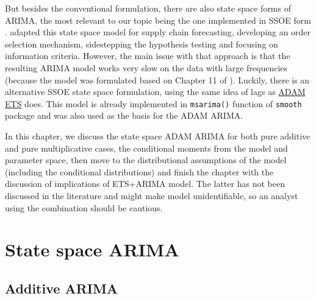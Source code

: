 \documentclass[
]{book}
\theoremstyle{definition}
\theoremstyle{definition}
\theoremstyle{definition}
\theoremstyle{definition}
\theoremstyle{remark}
\begin{document}
But besides the conventional formulation, there are also state space forms of ARIMA, the most relevant to our topic being the one implemented in SSOE form \citep[Chapter 11 of][]{Hyndman2008b}. \citet{Svetunkov2019} adapted this state space model for supply chain forecasting, developing an order selection mechanism, sidestepping the hypothesis testing and focusing on information criteria. However, the main issue with that approach is that the resulting ARIMA model works very slow on the data with large frequencies (because the model was formulated based on Chapter 11 of \citet{Hyndman2008b}). Luckily, there is an alternative SSOE state space formulation, using the same idea of lags as \protect\hyperlink{ADAMETSPureAdditive}{ADAM ETS} does. This model is already implemented in \texttt{msarima()} function of \texttt{smooth} package and was also used as the basis for the ADAM ARIMA.

In this chapter, we discuss the state space ADAM ARIMA for both pure additive and pure multiplicative cases, the conditional moments from the model and parameter space, then move to the distributional assumptions of the model (including the conditional distributions) and finish the chapter with the discussion of implications of ETS+ARIMA model. The latter has not been discussed in the literature and might make model unidentifiable, so an analyst using the combination should be cautious.

\hypertarget{StateSpaceARIMA}{%
\section{State space ARIMA}\label{StateSpaceARIMA}}

\hypertarget{StateSpaceARIMAAdditive}{%
\subsection{Additive ARIMA}\label{StateSpaceARIMAAdditive}}
\end{document}
